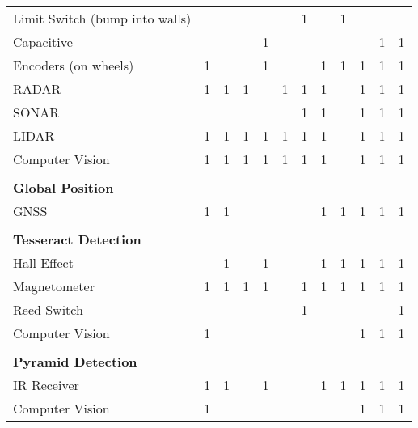 \documentclass[12pt]{article}
\begin{document}
\begin{table}[H]
\begin{tabular}{p{15.645em}|c|c|c|c|c|c|c|c|c|c|c}
    Limit Switch (bump into walls) &       &       &       &       &       & 1     &       & 1     &       &       &  \\
    Capacitive &       &       &       & 1     &       &       &       &       &       & 1     & 1 \\
    Encoders (on wheels) & 1     &       &       & 1     &       &       & 1     & 1     & 1     & 1     & 1 \\
    RADAR & 1     & 1     & 1     &       & 1     & 1     & 1     &       & 1     & 1     & 1 \\
    SONAR &       &       &       &       &       & 1     & 1     &       & 1     & 1     & 1 \\
    LIDAR & 1     & 1     & 1     & 1     & 1     & 1     & 1     &       & 1     & 1     & 1 \\
    Computer Vision & 1     & 1     & 1     & 1     & 1     & 1     & 1     &       & 1     & 1     & 1 \\
    \multicolumn{1}{r|}{} &       &       &       &       &       &       &       &       &       &       &  \\
    \midrule
    \textbf{Global Position} &       &       &       &       &       &       &       &       &       &       &  \\
    GNSS  & 1     & 1     &       &       &       &       & 1     & 1     & 1     & 1     & 1 \\
    \multicolumn{1}{r|}{} &       &       &       &       &       &       &       &       &       &       &  \\
    \midrule
    \textbf{Tesseract Detection} &       &       &       &       &       &       &       &       &       &       &  \\
    Hall Effect &       & 1     &       & 1     &       &       & 1     & 1     & 1     & 1     & 1 \\
    Magnetometer & 1     & 1     & 1     & 1     &       & 1     & 1     & 1     & 1     & 1     & 1 \\
    Reed Switch &       &       &       &       &       & 1     &       &       &       &       & 1 \\
    Computer Vision & 1     &       &       &       &       &       &       &       & 1     & 1     & 1 \\
    \multicolumn{1}{r|}{} &       &       &       &       &       &       &       &       &       &       &  \\
    \midrule
    \textbf{Pyramid Detection} &       &       &       &       &       &       &       &       &       &       &  \\
    IR Receiver & 1     & 1     &       & 1     &       &       & 1     & 1     & 1     & 1     & 1 \\
    Computer Vision & 1     &       &       &       &       &       &       &       & 1     & 1     & 1 \\
    \end{tabular}%
  \label{tab:addlabel}%
\end{table}%
\end{document}

